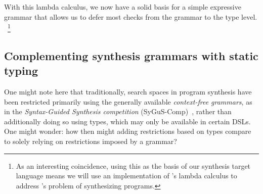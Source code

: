 \documentclass{article}
\begin{document}

With this lambda calculus, we now have a solid basis for a simple expressive grammar that allows us to defer most checks from the grammar to the type level.%
~\footnote{
    As an interesting coincidence,
    using this as the basis of our synthesis target language means
    we will use an implementation of \citet{lambdacalculus}'s lambda calculus
    to address \citet{church1957applications}'s problem of synthesizing programs.
}

\subsection{Complementing synthesis grammars with static typing} \label{sec:statictyping}


One might note here that traditionally,
search spaces in program synthesis have been restricted
primarily using the generally available \emph{context-free grammars},
as in the
\emph{Syntax-Guided Synthesis competition} (SyGuS-Comp)~\citep{sygus},
rather than additionally doing so using types, which may only be available in certain DSLs.
One might wonder: how then might adding restrictions based on types
compare to solely relying on restrictions imposed by a grammar?
\end{document}
